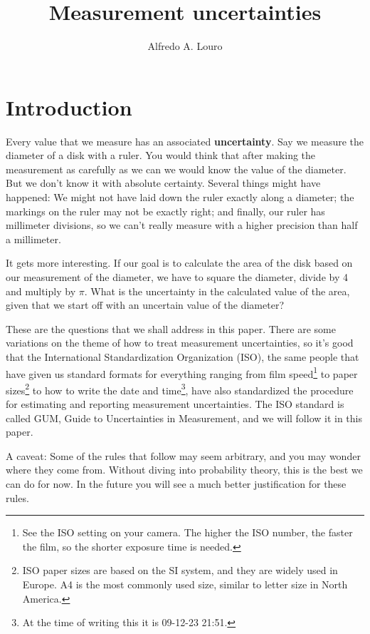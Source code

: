 \documentclass[justified]{tufte-handout}
\title{Measurement uncertainties}
\author{Alfredo A. Louro}
\date{}
\begin{document}
\maketitle

\section{Introduction}
Every value that we measure has an associated
\textbf{uncertainty}. Say we measure the diameter of a disk with a
ruler. You would think that after making the measurement as carefully
as we can we would know the value of the diameter. But we don't know
it with absolute certainty. Several things might have happened: We
might not have laid down the ruler exactly along a diameter; the
markings on the ruler may not be exactly right; and finally, our ruler
has millimeter divisions, so we can't really measure with a higher
precision than half a millimeter. 

It gets more interesting. If our goal is to calculate the area of the disk based
on our measurement of the diameter, we have to square the diameter,
divide by 4 and multiply by $\pi$. What is the uncertainty in the
calculated value of the area, given that we start off with an
uncertain value of the diameter?

These are the questions that we shall address in this paper. There are
some variations on the theme of how to treat 
measurement uncertainties, so it's good that the International
Standardization Organization (ISO), the same people that have given us
standard formats for everything ranging from film speed\footnote{See
  the ISO setting on your camera. The higher the ISO number, the
  faster the film, so the shorter exposure time is needed.} to paper sizes\footnote{ISO paper sizes are based on
the SI system, and they are widely used in Europe. A4 is the most
commonly used size, similar to letter size in North America.}
to how to write the date and time\footnote{At the time of writing this it is
09-12-23 21:51.}, have also standardized the procedure for estimating
and reporting measurement uncertainties. The ISO standard is called
GUM, Guide to Uncertainties in Measurement, and we will follow it in
this paper.

A caveat: Some of the rules that follow may seem arbitrary, and you
may wonder where they come from. Without diving into probability
theory, this is the best we can do for now. In the future you will see
a much better justification for these rules.
\end{document}
